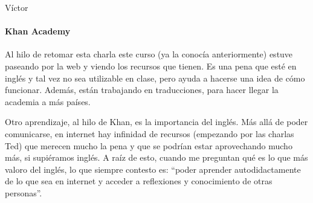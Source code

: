 \begin{opin}{\victorcolor}{Víctor}
\paragraph{Khan Academy}

Al hilo de retomar esta charla este curso (ya la conocía anteriormente) estuve paseando por la web y viendo los recursos que tienen.
%
Es una pena que esté en inglés y tal vez no sea utilizable en clase, pero ayuda a hacerse una idea de cómo funcionar. 
%
Además, están trabajando en traducciones, para hacer llegar la academia a más países.

Otro aprendizaje, al hilo de Khan, es la importancia del inglés. 
%
Más allá de poder comunicarse, en internet hay infinidad de recursos (empezando por las charlas Ted) que merecen mucho la pena y que se podrían estar aprovechando mucho más, si supiéramos inglés.
%
A raíz de esto, cuando me preguntan qué es lo que más valoro del inglés, lo que siempre contesto es: ``poder aprender autodidactamente de lo que sea en internet y acceder a reflexiones y conocimiento de otras personas''.


\end{opin}

